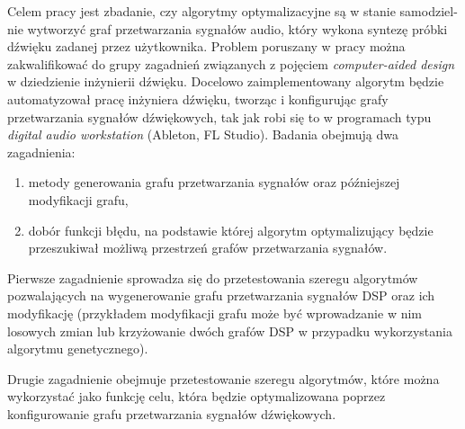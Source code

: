 Celem pracy jest zbadanie, czy algorytmy optymalizacyjne są w stanie samodziel-
nie wytworzyć graf przetwarzania sygnałów audio, który wykona syntezę próbki
dźwięku zadanej przez użytkownika.
Problem poruszany w pracy można zakwalifikować do grupy zagadnień związanych
z pojęciem \textit{computer-aided design} w dziedzienie inżynierii dźwięku. Docelowo
zaimplementowany algorytm będzie automatyzował pracę inżyniera dźwięku,
tworząc i konfigurując grafy przetwarzania sygnałów dźwiękowych, tak jak robi
się to w programach typu \textit{digital audio workstation} (Ableton, FL Studio).
Badania obejmują dwa zagadnienia:
\begin{enumerate} \label{research_types}
    \item metody generowania grafu przetwarzania sygnałów oraz późniejszej modyfikacji grafu,
    \item dobór funkcji błędu, na podstawie której algorytm optymalizujący będzie przeszukiwał
możliwą przestrzeń grafów przetwarzania sygnałów.
\end{enumerate}
Pierwsze zagadnienie sprowadza się do przetestowania szeregu algorytmów pozwalających na wygenerowanie
grafu przetwarzania sygnałów DSP oraz ich modyfikację (przykładem modyfikacji grafu
może być wprowadzanie w nim losowych zmian lub krzyżowanie dwóch grafów DSP w przypadku
wykorzystania algorytmu genetycznego).

Drugie zagadnienie obejmuje przetestowanie szeregu algorytmów, które można wykorzystać jako funkcję celu,
która będzie optymalizowana poprzez konfigurowanie grafu przetwarzania sygnałów dźwiękowych.



